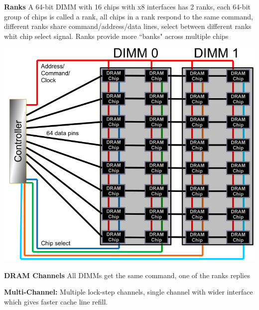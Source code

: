 \textbf{Ranks} A 64-bit DIMM with 16 chips with x8 interfaces has 2 ranks, each
64-bit group of chips is called a rank, all chips in a rank respond to the same
command, different ranks share command/address/data lines, select between different
ranks whit chip select signal. Ranks provide more ``banks" across multiple chips

\includegraphics[width=\linewidth]{png/rank.png}

\textbf{DRAM Channels} All DIMMs get the same command, one of the ranks replies

\textbf{Multi-Channel:} Multiple lock-step channels, single channel with wider
interface which gives faster cache line refill.
